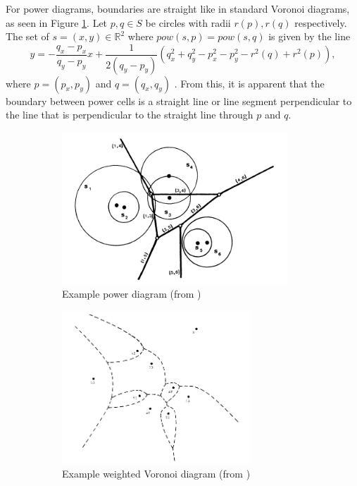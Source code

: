 \documentclass[a4paper, 11pt]{article}
\newcommand{\R}{\mathbb{R}}
\begin{document}
For power diagrams, boundaries are straight like in standard Voronoi diagrams, as seen in Figure \ref{fig:pow}. Let $p, q \in S$ be circles with radii $r(p), r(q)$ respectively. The set of $s = (x,y) \in \R^2$ where $pow(s,p) = pow(s,q)$
is given by the line
\begin{equation*}
  y = -\frac{q_x - p_x}{q_y - p_y} x + \frac{1}{2(q_y - p_y)} \left(q_x^2 + q_y^2 - p_x^2 - p_y^2 - r^2(q) + r^2(p) \right),
  \label{eq:pow_intersect}
\end{equation*}
where $p = (p_x, p_y)$ and $q = (q_x, q_y)$ \cite{aurenhammer_power}. From this, it is apparent that the boundary between power cells is a straight line or line segment perpendicular to the
line that is perpendicular to the straight line through $p$ and $q$.

\begin{figure}[h]
  \centering
  \begin{subfigure}[t]{0.45 \textwidth}
    \includegraphics[height=2.25in]{power(aur_pow).png}
    \caption{Example power diagram (from \cite{aurenhammer_power})}
    \label{fig:pow}
  \end{subfigure}
  \begin{subfigure}[t]{0.47\textwidth}
    \includegraphics[height=2.25in]{weighted(aur_surv).png}
    \caption{Example weighted Voronoi diagram (from \cite{aurenhammer_survey})}
    \label{fig:wgt}
  \end{subfigure}
  \caption{}
\end{figure}
\end{document}
